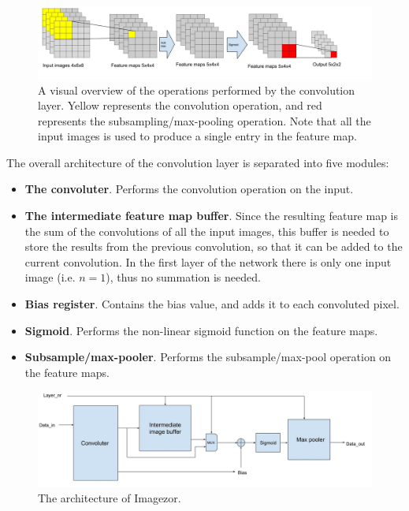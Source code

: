 \begin{figure}[h!]
  \centering
      \includegraphics[width=1.0\textwidth]{Figures/Method/Convolution_subsample_pool}
  \caption{A visual overview of the operations performed by the convolution layer. Yellow represents the convolution operation, and red represents the subsampling/max-pooling operation. Note that all the input images is used to produce a single entry in the feature map.}
  \label{fig_visual_conv_ss_mp}
\end{figure}



The overall architecture of the convolution layer is separated into five modules:

\begin{itemize}
	\item \textbf{The convoluter}. Performs the convolution operation on the input.
	\item \textbf{The intermediate feature map buffer}. Since the resulting feature map is the sum of the convolutions of all the input images, this buffer is needed to store the results from the previous convolution, so that it can be added to the current convolution. In the first layer of the network there is only one input image (i.e. $ n = 1 $), thus no summation is needed.
	\item \textbf{Bias register}. Contains the bias value, and adds it to each convoluted pixel. 
	\item \textbf{Sigmoid}. Performs the non-linear sigmoid function  on the feature maps.
	\item \textbf{Subsample/max-pooler}. Performs the subsample/max-pool operation on the feature maps. 
\end{itemize}

\begin{figure}[h!]
  \centering
      \includegraphics[width=1.0\textwidth]{Figures/Method/conv_layer_arch}
  \caption{The architecture of Imagezor.}
\end{figure}


